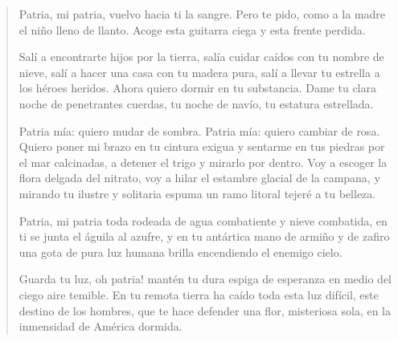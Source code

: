 \documentclass[12pt]{article}
\begin{document}
\clearpage
{}
\begin{verse}
Patria, mi patria, vuelvo hacia ti la sangre.  
Pero te pido, como a la madre el niño  
lleno de llanto.  
	 Acoge  
esta guitarra ciega  
y esta frente perdida.  
	
Salí a encontrarte hijos por la tierra,  
salía cuidar caídos con tu nombre de nieve,  
salí a hacer una casa con tu madera pura,  
salí a llevar tu estrella a los héroes heridos.  
Ahora quiero dormir en tu substancia.  
Dame tu clara noche de penetrantes cuerdas,  
tu noche de navío, tu estatura estrellada.  
	
Patria mía: quiero mudar de sombra.  
Patria mía: quiero cambiar de rosa.  
Quiero poner mi brazo en tu cintura exigua  
y sentarme en tus piedras por el mar calcinadas,  
a detener el trigo y mirarlo por dentro.  
Voy a escoger la flora delgada del nitrato,  
voy a hilar el estambre glacial de la campana,  
y mirando tu ilustre y solitaria espuma  
un ramo litoral tejeré a tu belleza.  
	
Patria, mi patria  
toda rodeada de agua combatiente  
y nieve combatida,  
en ti se junta el águila al azufre,  
y en tu antártica mano de armiño y de zafiro  
una gota de pura luz humana  
brilla encendiendo el enemigo cielo.  
	
Guarda tu luz, oh patria! mantén  
tu dura espiga de esperanza en medio  
del ciego aire temible.  
En tu remota tierra ha caído toda esta luz difícil,  
este destino de los hombres,  
que te hace defender una flor, misteriosa  
sola, en la inmensidad de América dormida.  

\end{verse}
\end{document}
